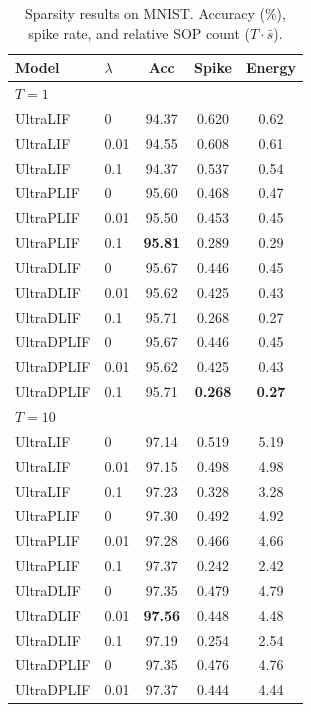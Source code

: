 \documentclass{article}
\theoremstyle{plain}
\theoremstyle{definition}
\theoremstyle{remark}
\begin{document}
\begin{table}[h]
\caption{Sparsity results on MNIST. Accuracy (\%), spike rate, and relative SOP count ($T \cdot \bar{s}$).}
\label{tab:sparsity_mnist}
\vskip 0.1in
\begin{center}
\begin{small}
\begin{tabular}{llccc}
\toprule
Model & $\lambda$ & Acc & Spike & Energy \\
\midrule
\multicolumn{5}{l}{\textit{$T{=}1$}} \\
UltraLIF   & 0    & 94.37 & 0.620 & 0.62 \\
UltraLIF   & 0.01 & 94.55 & 0.608 & 0.61 \\
UltraLIF   & 0.1  & 94.37 & 0.537 & 0.54 \\
UltraPLIF  & 0    & 95.60 & 0.468 & 0.47 \\
UltraPLIF  & 0.01 & 95.50 & 0.453 & 0.45 \\
UltraPLIF  & 0.1  & \textbf{95.81} & 0.289 & 0.29 \\
UltraDLIF  & 0    & 95.67 & 0.446 & 0.45 \\
UltraDLIF  & 0.01 & 95.62 & 0.425 & 0.43 \\
UltraDLIF  & 0.1  & 95.71 & 0.268 & 0.27 \\
UltraDPLIF & 0    & 95.67 & 0.446 & 0.45 \\
UltraDPLIF & 0.01 & 95.62 & 0.425 & 0.43 \\
UltraDPLIF & 0.1  & 95.71 & \textbf{0.268} & \textbf{0.27} \\
\midrule
\multicolumn{5}{l}{\textit{$T{=}10$}} \\
UltraLIF   & 0    & 97.14 & 0.519 & 5.19 \\
UltraLIF   & 0.01 & 97.15 & 0.498 & 4.98 \\
UltraLIF   & 0.1  & 97.23 & 0.328 & 3.28 \\
UltraPLIF  & 0    & 97.30 & 0.492 & 4.92 \\
UltraPLIF  & 0.01 & 97.28 & 0.466 & 4.66 \\
UltraPLIF  & 0.1  & 97.37 & 0.242 & 2.42 \\
UltraDLIF  & 0    & 97.35 & 0.479 & 4.79 \\
UltraDLIF  & 0.01 & \textbf{97.56} & 0.448 & 4.48 \\
UltraDLIF  & 0.1  & 97.19 & 0.254 & 2.54 \\
UltraDPLIF & 0    & 97.35 & 0.476 & 4.76 \\
UltraDPLIF & 0.01 & 97.37 & 0.444 & 4.44 \\

\end{tabular}
\end{small}
\end{center}
\end{table}
\end{document}
